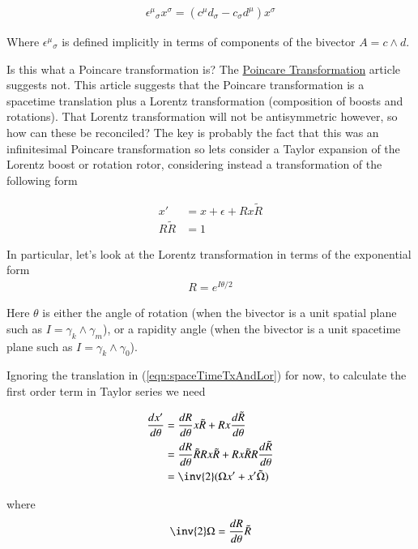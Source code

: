 \begin{align*}
{\epsilon^\mu}_\sigma x^\sigma = (c^\mu d_\sigma -c_\sigma d^\mu ) x^\sigma 
\end{align*}

Where ${\epsilon^\mu}_\sigma$ is defined implicitly in terms of components of the bivector $A = c \wedge d$.

Is this what a Poincare transformation is?  The \href{http://mathworld.wolfram.com/PoincareTransformation.html}{Poincare Transformation} article suggests not.  This article suggests that the Poincare transformation is a spacetime translation plus a Lorentz transformation (composition of boosts and rotations).  That Lorentz transformation will not be antisymmetric however, so how can these be reconciled?  The key is probably the fact that this was an infinitesimal Poincare transformation so lets consider a Taylor expansion of the Lorentz boost or rotation rotor, considering instead a transformation of the following form

\begin{align}\label{eqn:spaceTimeTxAndLor}
x' &= x + \epsilon + R x \tilde{R} \\
R \tilde{R} &= 1
\end{align}

In particular, let's look at the Lorentz transformation in terms of the exponential form
\begin{align*}
R = e^{I \theta/2}
\end{align*}

Here $\theta$ is either the angle of rotation (when the bivector is a unit spatial plane such as $I = \gamma_k \wedge \gamma_m$), or a rapidity angle (when the bivector is a unit spacetime plane such as $I = \gamma_k \wedge \gamma_0$).

Ignoring the translation in (\ref{eqn:spaceTimeTxAndLor}) for now, to calculate the first order term in Taylor series we need

\begin{align*}
\frac{dx'}{d\theta} 
&= 
\frac{dR}{d\theta}  x \tilde{R} 
+
{R} x \frac{d\tilde{R}}{d\theta}  
\\
&= 
\frac{dR}{d\theta} \tilde{R} R x \tilde{R} 
+
{R} x \tilde{R} R \frac{d\tilde{R}}{d\theta}  
\\
&=
\inv{2} ( \Omega x' + x' \tilde{\Omega} ) \\
\end{align*}

where 
\begin{align*}
\inv{2}\Omega = \frac{dR}{d\theta} \tilde{R} 
\end{align*}

